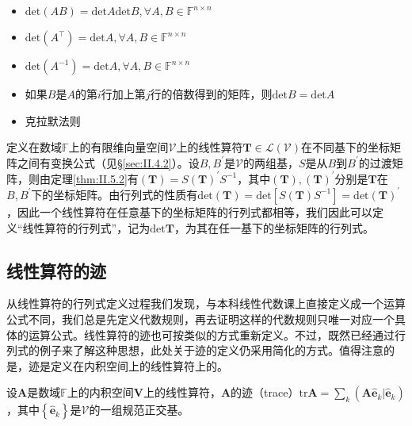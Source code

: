 \documentclass[main.tex]{subfiles}
\begin{document}
\begin{theorem}
\quad
\begin{itemize}
    \item $\mathrm{det}\left(AB\right)=\mathrm{det}A\mathrm{det}B,\forall A,B\in\mathbb{F}^{n\times n}$
    \item $\mathrm{det}\left(A^\intercal\right)=\mathrm{det}A,\forall A,B\in\mathbb{F}^{n\times n}$
    \item $\mathrm{det}\left(A^{-1}\right)=\mathrm{det}A,\forall A,B\in\mathbb{F}^{n\times n}$
    \item 如果$B$是$A$的第$i$行加上第$j$行的倍数得到的矩阵，则$\mathrm{det}B=\mathrm{det}A$
    \item 克拉默法则\cite[\S1.5,p.~15]{周胜林2012线性代数}
\end{itemize}
\end{theorem}

定义在数域$\mathbb{F}$上的有限维向量空间$\mathcal{V}$上的线性算符$\mathbf{T}\in\mathcal{L}\left(\mathcal{V}\right)$在不同基下的坐标矩阵之间有变换公式（见\S\ref{sec:II.4.2}）。设$B,B^\prime$是$\mathcal{V}$的两组基，$S$是从$B$到$B^\prime$的过渡矩阵，则由定理\ref{thm:II.5.2}有$\left(\mathbf{T}\right)=S\left(\mathbf{T}\right)^\prime S^{-1}$，其中$\left(\mathbf{T}\right),\left(\mathbf{T}\right)^\prime$分别是$\mathbf{T}$在$B,B^\prime$下的坐标矩阵。由行列式的性质有$\mathrm{det}\left(\mathbf{T}\right)=\mathrm{det}\left[S\left(\mathbf{T}\right)S^{-1}\right]=\mathrm{det}\left(\mathbf{T}\right)^\prime$，因此一个线性算符在任意基下的坐标矩阵的行列式都相等，我们因此可以定义“线性算符的行列式”，记为$\mathrm{det}\mathbf{T}$，为其在任一基下的坐标矩阵的行列式。

\subsection{线性算符的迹}
从线性算符的行列式定义过程我们发现，与本科线性代数课上直接定义成一个运算公式不同，我们总是先定义代数规则，再去证明这样的代数规则只唯一对应一个具体的运算公式。线性算符的迹也可按类似的方式重新定义。不过，既然已经通过行列式的例子来了解这种思想，此处关于迹的定义仍采用简化的方式。值得注意的是，迹是定义在内积空间上的线性算符上的。

\begin{definition}[线性算符的迹]
设$\mathbf{A}$是数域$\mathbb{F}$上的内积空间$\mathbf{V}$上的线性算符，$\mathbf{A}$的迹（trace）$\mathrm{tr}\mathbf{A}=\sum_k\left(\mathbf{A}\mathbf{\hat{e}}_k|\mathbf{\hat{e}}_k\right)$，其中$\left\{\mathbf{\hat{e}}_k\right\}$是$\mathcal{V}$的一组规范正交基。
\end{definition}
\end{document}
